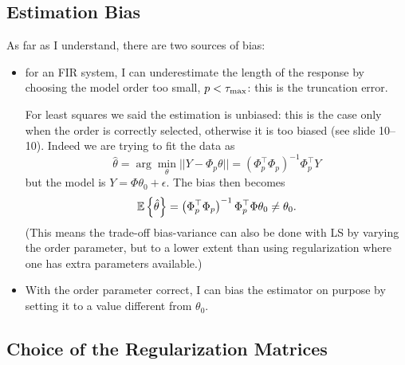 \subsection{Estimation Bias}
\label{sec:estimation-bias}

As far as I understand, there are two sources of bias:
\begin{itemize}
\item for an FIR system, I can underestimate the length of the response by choosing the model order too small, $p<\tau_\text{max}$: this is the truncation error.

  For least squares we said the estimation is unbiased: this is the case only when the order is correctly selected, otherwise it is too biased (see slide 10--10). Indeed we are trying to fit the data as
  \begin{equation*}
    \hat{\theta} = \arg \min_\theta ||Y - \Phi_p\theta|| = \left(\Phi_p^\top \Phi_p\right)^{-1}\Phi_p^\top Y
  \end{equation*}
  but the model is $Y = \Phi\theta_0 + \epsilon$. The bias then becomes
  \begin{equation*}
    \mathbb{E}\left\{\hat{\theta}\right\} = \left(\Phi_p^\top \Phi_p\right)^{-1}\Phi_p^\top\Phi \theta_0 \neq \theta_0.
  \end{equation*}
  (This means the trade-off bias-variance can also be done with LS by varying the order parameter, but to a lower extent than using regularization where one has extra parameters available.)
\item With the order parameter correct, I can bias the estimator on purpose by setting it to a value different from $\theta_0$.
\end{itemize}

\subsection{Choice of the Regularization Matrices}
\label{sec:regularization-matrices}

